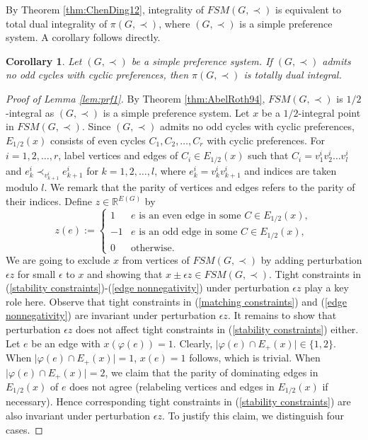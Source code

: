 \documentclass[11pt]{article}
\newtheorem{corollary}[theorem]{Corollary}
\numberwithin{theorem}{section}
\begin{document}
By Theorem \ref{thm:ChenDing12}, integrality of $FSM(G,\prec)$ is equivalent to total dual integrality of $\pi(G,\prec)$, where $(G,\prec)$ is a simple preference system. A corollary follows directly.

\begin{corollary}
\label{cor:prf2}
Let $(G,\prec)$ be a simple preference system. If $(G,\prec)$ admits no odd cycles with cyclic preferences, then $\pi(G,\prec)$ is totally dual integral.
\end{corollary}

\begin{proof}[Proof of Lemma \ref{lem:prf1}]
By Theorem \ref{thm:AbelRoth94}, $FSM(G,\prec)$ is $1/2$-integral as $(G,\prec)$ is a simple preference system.
Let $x$ be a $1/2$-integral point in $FSM(G, \prec)$.
Since $(G,\prec)$ admits no odd cycles with cyclic preferences, $E_{1/2}(x)$ consists of even cycles $C_1,C_2,\ldots,C_r$ with cyclic preferences. For $i=1,2,\ldots,r$, label vertices and edges of $C_i\in E_{1/2}(x)$ such that $C_i=v^i_1v^i_2\ldots v^i_{l}$ and $e^i_k\prec_{v^i_{k+1}} e^i_{k+1}$ for $k=1,2,\ldots,l$, where $e^i_k=v^i_{k}v^i_{k+1}$ and indices are taken modulo $l$.
We remark that the parity of vertices and edges refers to the parity of their indices. Define $z\in \mathbb{R}^{E(G)}$ by
\begin{equation*}
z(e):=
\begin{cases}
1 & e\text{ is an even edge in some }C \in E_{1/2}(x),\\
-1 & e\text{ is an odd edge in some }C \in E_{1/2}(x),\\
0 & \text{otherwise}.
\end{cases}
\end{equation*}
We are going to exclude $x$ from vertices of $FSM(G, \prec)$ by adding perturbation $\epsilon z$ for small $\epsilon$ to $x$ and showing that $x\pm\epsilon z\in FSM(G,\prec)$.
Tight constraints in (\ref{stability constraints})-(\ref{edge nonnegativity}) under perturbation $\epsilon z$ play a key role here. Observe that tight constraints in (\ref{matching constraints}) and (\ref{edge nonnegativity}) are invariant under perturbation $\epsilon z$. It remains to show that perturbation $\epsilon z$ does not affect tight constraints in (\ref{stability constraints}) either. Let $e$ be an edge with $x(\varphi(e))=1$. Clearly, $\lvert \varphi(e)\cap E_+(x)\rvert \in\{1,2\}$. When $\lvert \varphi(e)\cap E_+(x)\rvert=1$, $x(e)=1$ follows, which is trivial. When $\lvert \varphi(e)\cap E_+(x)\rvert =2$, we claim that the parity of dominating edges in $E_{1/2}(x)$ of $e$ does not agree (relabeling vertices and edges in $E_{1/2}(x)$ if necessary).
Hence corresponding tight constraints in (\ref{stability constraints}) are also invariant under perturbation $\epsilon z$.
To justify this claim, we distinguish four cases.


\end{proof}
\end{document}
